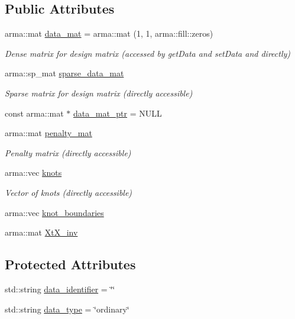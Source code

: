\subsection*{Public Attributes}
\begin{DoxyCompactItemize}
\item 
arma\+::mat \mbox{\hyperlink{classdata_1_1_data_ae78ec61bd569e32f3b34056d3f6f48f4}{data\+\_\+mat}} = arma\+::mat (1, 1, arma\+::fill\+::zeros)
\begin{DoxyCompactList}\small\item\em Dense matrix for design matrix (accessed by get\+Data and set\+Data and directly) \end{DoxyCompactList}\item 
arma\+::sp\+\_\+mat \mbox{\hyperlink{classdata_1_1_data_abc5c5380b4aa8120cdda74195b90955f}{sparse\+\_\+data\+\_\+mat}}
\begin{DoxyCompactList}\small\item\em Sparse matrix for design matrix (directly accessible) \end{DoxyCompactList}\item 
const arma\+::mat $\ast$ \mbox{\hyperlink{classdata_1_1_data_a3aa3b54f91bede8726e22ccfe8751b31}{data\+\_\+mat\+\_\+ptr}} = N\+U\+LL
\item 
arma\+::mat \mbox{\hyperlink{classdata_1_1_data_a1fd248ad8885deae217b8720fcf22e78}{penalty\+\_\+mat}}
\begin{DoxyCompactList}\small\item\em Penalty matrix (directly accessible) \end{DoxyCompactList}\item 
arma\+::vec \mbox{\hyperlink{classdata_1_1_data_abe246684192000f9a0d85bc84bfcccdf}{knots}}
\begin{DoxyCompactList}\small\item\em Vector of knots (directly accessible) \end{DoxyCompactList}\item 
arma\+::vec \mbox{\hyperlink{classdata_1_1_data_acfe89753c5bbb4a9361b5aa0f6d7f015}{knot\+\_\+boundaries}}
\item 
arma\+::mat \mbox{\hyperlink{classdata_1_1_data_a31bdf7564f8589487a0ee9952ebef0c0}{Xt\+X\+\_\+inv}}
\end{DoxyCompactItemize}
\subsection*{Protected Attributes}
\begin{DoxyCompactItemize}
\item 
std\+::string \mbox{\hyperlink{classdata_1_1_data_ad61ef163c5ec01dd46be054a688d2be8}{data\+\_\+identifier}} = \char`\"{}\char`\"{}
\item 
std\+::string \mbox{\hyperlink{classdata_1_1_data_a2331c9e9c2b0905c6a2eedc68889a698}{data\+\_\+type}} = \char`\"{}ordinary\char`\"{}
\end{DoxyCompactItemize}


